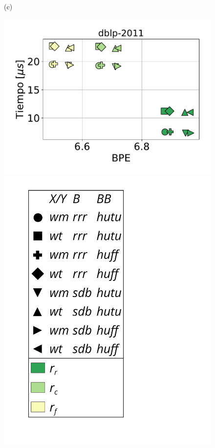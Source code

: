 \begin{figure}
\begin{minipage}{1\textwidth}
\begin{minipage}{0.45\textwidth}
    			(c)
    		\end{minipage}
    		\begin{minipage}{0.45\textwidth}
    			\centering
    			\begin{minipage}{0.75\textwidth}
    				\centering
    				\includegraphics[width=1\linewidth]{img/sdsl/aleatorio/dblp-2011.pdf}
    			\end{minipage}
    			\begin{minipage}{0.2\textwidth}
    				\centering
    				\includegraphics[scale=.16, clip, trim=70 0 0 0]{img/sdsl/label.pdf}
    			\end{minipage}
    			

\end{minipage}
\end{minipage}
\end{figure}
